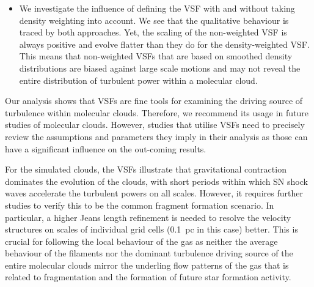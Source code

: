\begin{itemize}
	\item We investigate the influence of defining the VSF with and without taking density weighting into account. We see that the qualitative behaviour is traced by both approaches. Yet, the scaling of the non-weighted VSF is always positive and evolve flatter than they do for the density-weighted VSF. This means that non-weighted VSFs that are based on smoothed density distributions are biased against large scale motions and may not reveal the entire distribution of turbulent power within a molecular cloud. 
\end{itemize}

Our analysis shows that VSFs are fine tools for examining the driving source of turbulence within molecular clouds.
Therefore, we recommend its usage in future studies of molecular clouds.
However, studies that utilise VSFs need to precisely review the assumptions and parameters they imply in their analysis as those can have a significant influence on the out-coming results.

For the simulated clouds, the VSFs illustrate that gravitational contraction dominates the evolution of the clouds, with short periods within which SN shock waves accelerate the turbulent powers on all scales. 
However, it requires further studies to verify this to be the common fragment formation scenario. 
In particular, a higher Jeans length refinement is needed to resolve the velocity structures on scales of individual grid cells (0.1~pc in this case) better.
This is crucial for following the local behaviour of the gas as neither the average behaviour of the filaments nor the dominant turbulence driving source of the entire molecular clouds mirror the underling flow patterns of the gas that is related to fragmentation and the formation of future star formation activity. 



\endinput
